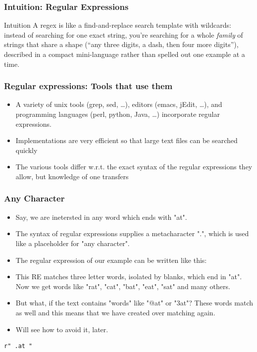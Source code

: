 \begin{frame}[fragile]\frametitle{Intuition: Regular Expressions}
\begin{block}{Intuition}
A regex is like a find-and-replace search template with wildcards: instead of searching for one
exact string, you're searching for a whole \emph{family} of strings that share a shape (``any
three digits, a dash, then four more digits''), described in a compact mini-language rather than
spelled out one example at a time.
\end{block}
\end{frame}

 \begin{frame}[fragile]
  \frametitle{Regular expressions: Tools that use them}

  \begin{itemize}
  \item A variety of unix tools (grep, sed, \ldots), editors (emacs,
    jEdit, \ldots), and programming languages (perl, python, Java, \ldots)
    incorporate regular expressions.

  \item Implementations are very efficient so that large text files
    can be searched quickly
\item The various tools differ w.r.t. the exact syntax of the regular
expressions they allow, but knowledge of one transfers
  \end{itemize}
\end{frame}


 \begin{frame}[fragile]
\frametitle{Any Character}

\begin{itemize}
\item Say, we are inetersted in any word which ends with "at".
\item The syntax of regular expressions supplies a metacharacter ".", which is used like a placeholder for "any character". 
\item The regular expression of our example can be written like this: 
\item This RE matches three letter words, isolated by blanks, which end in "at". Now we get words like "rat", "cat", "bat", "eat", "sat" and many others. 
\item But what, if the text contains "words" like "@at" or "3at"? These words match as well and this means that we have created over matching again. 
\item Will see how to avoid it, later.
\end{itemize}


\begin{lstlisting}
r" .at " 
\end{lstlisting}
\end{frame}

